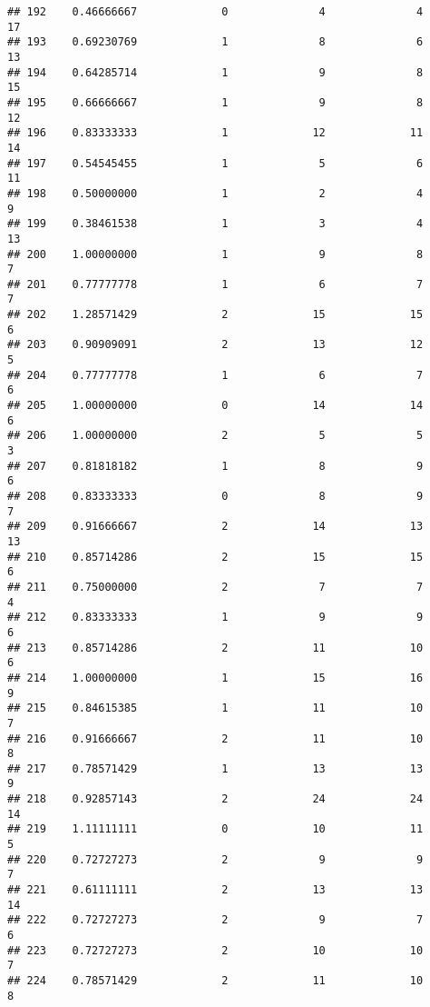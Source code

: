 \documentclass[
]{article}
\begin{document}
\begin{verbatim}
## 192    0.46666667             0              4              4             17
## 193    0.69230769             1              8              6             13
## 194    0.64285714             1              9              8             15
## 195    0.66666667             1              9              8             12
## 196    0.83333333             1             12             11             14
## 197    0.54545455             1              5              6             11
## 198    0.50000000             1              2              4              9
## 199    0.38461538             1              3              4             13
## 200    1.00000000             1              9              8              7
## 201    0.77777778             1              6              7              7
## 202    1.28571429             2             15             15              6
## 203    0.90909091             2             13             12              5
## 204    0.77777778             1              6              7              6
## 205    1.00000000             0             14             14              6
## 206    1.00000000             2              5              5              3
## 207    0.81818182             1              8              9              6
## 208    0.83333333             0              8              9              7
## 209    0.91666667             2             14             13             13
## 210    0.85714286             2             15             15              6
## 211    0.75000000             2              7              7              4
## 212    0.83333333             1              9              9              6
## 213    0.85714286             2             11             10              6
## 214    1.00000000             1             15             16              9
## 215    0.84615385             1             11             10              7
## 216    0.91666667             2             11             10              8
## 217    0.78571429             1             13             13              9
## 218    0.92857143             2             24             24             14
## 219    1.11111111             0             10             11              5
## 220    0.72727273             2              9              9              7
## 221    0.61111111             2             13             13             14
## 222    0.72727273             2              9              7              6
## 223    0.72727273             2             10             10              7
## 224    0.78571429             2             11             10              8

\end{verbatim}
\end{document}

